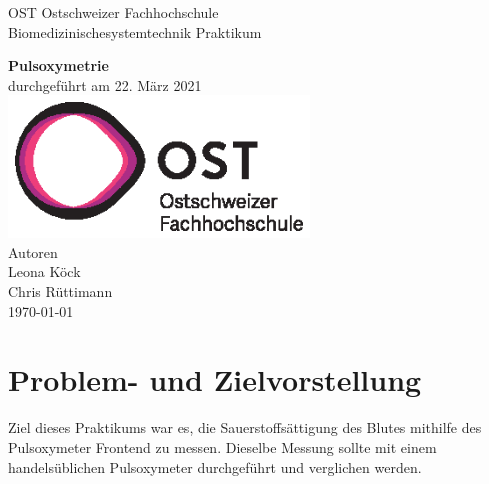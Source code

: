 \documentclass[11pt]{scrartcl}
\begin{document}
    \begin{titlepage}
        \begin{center}
        {\LARGE OST Ostschweizer Fachhochschule}
            \\[1.5cm]
            \linespread{1.2}\large { Biomedizinischesystemtechnik Praktikum }

            \huge{\bfseries Pulsoxymetrie}
            \\%
            \large{durchgef{\"u}hrt am 22. März 2021}
            \\[1.5cm]
           \includegraphics[width=8cm]{../images/ost_logo.eps}
           \\[1cm]
            {\small{Autoren}}\\
            {\Large{Leona K{\"o}ck}}\\
            {\Large{Chris R{\"u}ttimann}}
            \\[1cm]

            \vspace*{\fill}
            \large{\today}
        \end{center}

    \end{titlepage}

    \addtocounter{section}{0}

    \tableofcontents
    \pagebreak



    \section{Problem- und Zielvorstellung}
   Ziel dieses Praktikums war es, die Sauerstoffsättigung des Blutes mithilfe des Pulsoxymeter Frontend zu messen. 
   Dieselbe Messung sollte mit einem handelsüblichen Pulsoxymeter durchgeführt und verglichen werden.
\end{document}
